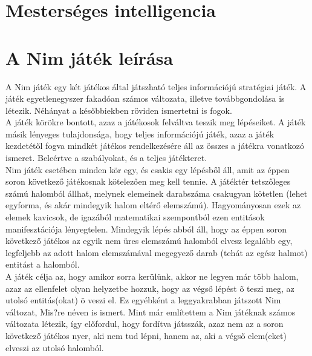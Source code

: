 \label{Chap:tema}

\section{Mesterséges intelligencia}

\section{A Nim játék leírása}
A Nim játék egy két játékos által játszható teljes információjú stratégiai játék. A játék egyetlenegyszer fakadóan számos változata, illetve továbbgondolása is létezik. Néhányat a későbbiekben röviden ismertetni is fogok. \\

A játék körökre bontott, azaz a játékosok felváltva teszik meg lépéseiket. A játék másik lényeges tulajdonsága, hogy teljes információjú játék, azaz a játék kezdetétől fogva mindkét játékos rendelkezésére áll az összes a játékra vonatkozó ismeret. Beleértve a szabályokat, és a teljes játékteret.\\

Nim játék esetében minden kör egy, és csakis egy lépésből áll, amit az éppen soron következő játékosnak kötelezően meg kell tennie. A játéktér tetszőleges számú halomból állhat, melynek elemeinek darabszáma csakugyan kötetlen (lehet egyforma, és akár mindegyik halom eltérő elemszámú). Hagyományosan ezek az elemek kavicsok, de igazából matematikai szempontból ezen entitások manifesztációja lényegtelen. Mindegyik lépés abból áll, hogy az éppen soron következő játékos az egyik nem üres elemszámú halomból elvesz legalább egy, legfeljebb az adott halom elemszámával megegyező darab (tehát az egész halmot) entitást a halomból.\\

A játék célja az, hogy amikor sorra kerülünk, akkor ne legyen már több halom, azaz az ellenfelet olyan helyzetbe hozzuk, hogy az végső lépést õ teszi meg, az utolsó entitás(okat) õ veszi el. Ez egyébként a leggyakrabban játszott Nim változat, Mis?re néven is ismert. Mint már említettem a Nim játéknak számos változata létezik, így előfordul, hogy fordítva játsszák, azaz nem az a soron következő játékos nyer, aki nem tud lépni, hanem az, aki a végső elem(eket) elveszi az utolsó halomból.\\



